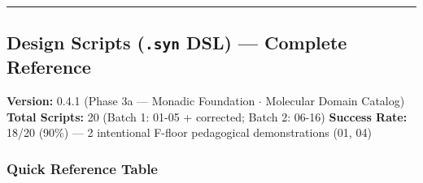 \documentclass[12pt,a4paper]{article}
\begin{document}
\begin{center}
\rule{0.5\textwidth}{0.4pt}
\end{center}

\subsection{Design Scripts (\texttt{.syn} DSL) --- Complete Reference}

\textbf{Version:} 0.4.1 (Phase 3a --- Monadic Foundation $\cdot$ Molecular Domain Catalog)
\textbf{Total Scripts:} 20 (Batch 1: 01-05 + corrected; Batch 2: 06-16)
\textbf{Success Rate:} 18/20 (90\%) --- 2 intentional F-floor pedagogical demonstrations (01, 04)

\subsubsection{Quick Reference Table}
\end{document}
